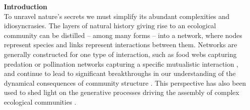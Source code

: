 \documentclass[twocolumn,preprintnumbers,amsmath,amssymb,superscriptaddress,linenumbers]{revtex4-1}
\newcommand{\rev}[1]{\textcolor{crimson}{#1}}
\begin{document}
\maketitle




\noindent \textbf{Introduction}\\
To unravel nature's secrets we must simplify its abundant complexities and idiosyncrasies.
The layers of natural history giving rise to an ecological community can be distilled -- among many forms -- into a network, where nodes represent species and links represent interactions between them.
Networks are generally constructed for one type of interaction, such as food webs capturing predation \cite{Paine1966,Dunne2002,Pascual2006} or pollination networks capturing a specific mutualistic interaction \cite{Bascompte2013}, and continue to lead to significant breakthroughs in our understanding of the dynamical consequences of community structure \cite{May1972,Gross2009,Allesina2012}.
This perspective has also been used to shed light on the generative processes driving the assembly of complex ecological communities \cite{Montoya2003,Bascompte2009}.

\end{document}
